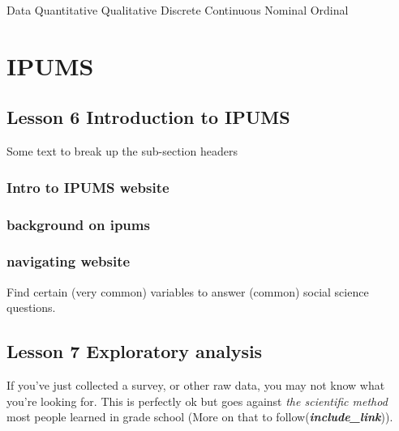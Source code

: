 \documentclass[
]{book}
\begin{document}
Data
Quantitative
Qualitative
Discrete
Continuous
Nominal
Ordinal

\hypertarget{ipums}{%
\chapter*{IPUMS}\label{ipums}}

\hypertarget{lesson-6-introduction-to-ipums}{%
\section*{Lesson 6 Introduction to IPUMS}\label{lesson-6-introduction-to-ipums}}

Some text to break up the sub-section headers

\hypertarget{intro-to-ipums-website}{%
\subsection*{Intro to IPUMS website}\label{intro-to-ipums-website}}

\hypertarget{background-on-ipums}{%
\subsection*{background on ipums}\label{background-on-ipums}}

\hypertarget{navigating-website}{%
\subsection*{navigating website}\label{navigating-website}}

Find certain (very common) variables to answer (common) social science questions.

\hypertarget{lesson-7-exploratory-analysis}{%
\section*{Lesson 7 Exploratory analysis}\label{lesson-7-exploratory-analysis}}

If you've just collected a survey, or other raw data, you may not know what you're looking for. This is perfectly ok but goes against \emph{the scientific method} most people learned in grade school (More on that to follow(\textbf{\emph{include\_link}})).
\end{document}
